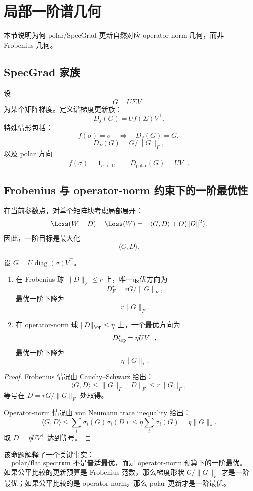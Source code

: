 \section{局部一阶谱几何}

本节说明为何 polar/SpecGrad 更新自然对应 operator-norm 几何，而非 Frobenius 几何。

\subsection{SpecGrad 家族}

设
\[
G=U\Sigma V^\top
\]
为某个矩阵梯度。定义谱梯度更新族：
\[
D_f(G)=Uf(\Sigma)V^\top.
\]
特殊情形包括：
\[
f(\sigma)=\sigma \quad \Rightarrow \quad D_f(G)=G,
\]
\[
D_F(G)=G/\|G\|_F,
\]
以及 polar 方向
\[
f(\sigma)=1_{\sigma>0},\qquad D_{\mathrm{polar}}(G)=UV^\top.
\]

\subsection{Frobenius 与 operator-norm 约束下的一阶最优性}

在当前参数点，对单个矩阵块考虑局部展开：
\[
\Loss(W-D)-\Loss(W)
= -\langle G,D\rangle+O(\|D\|^2).
\]
因此，一阶目标是最大化
\[
\langle G,D\rangle.
\]

\begin{proposition}[谱分配边界]
设 \(G=U\operatorname{diag}(\sigma)V^\top\)。
\begin{enumerate}[label=(\roman*)]
  \item 在 Frobenius 球 \(\|D\|_F\le r\) 上，唯一最优方向为
  \[
  D_F^\star=rG/\|G\|_F,
  \]
  最优一阶下降为
  \[
  r\|G\|_F.
  \]
  \item 在 operator-norm 球 \(\|D\|_{\op}\le \eta\) 上，一个最优方向为
  \[
  D_{\op}^\star=\eta UV^\top,
  \]
  最优一阶下降为
  \[
  \eta\|G\|_*.
  \]
\end{enumerate}
\end{proposition}

\begin{proof}
Frobenius 情况由 Cauchy--Schwarz 给出：
\[
\langle G,D\rangle\le \|G\|_F\|D\|_F\le r\|G\|_F,
\]
等号在 \(D=rG/\|G\|_F\) 处取得。

Operator-norm 情况由 von Neumann trace inequality 给出：
\[
\langle G,D\rangle
\le \sum_i\sigma_i(G)\sigma_i(D)
\le \eta\sum_i\sigma_i(G)
=\eta\|G\|_*.
\]
取 \(D=\eta UV^\top\) 达到等号。
\end{proof}

该命题解释了一个关键事实：
\[
\boxed{\text{polar/flat spectrum 不是普适最优，而是 operator-norm 预算下的一阶最优。}}
\]
如果公平比较的更新预算是 Frobenius 范数，那么梯度形状 \(G/\|G\|_F\) 才是一阶最优；如果公平比较的是 operator norm，那么 polar 更新才是一阶最优。
